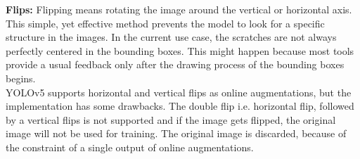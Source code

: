 \textbf{Flips:} Flipping means rotating the image around the vertical or horizontal axis. This simple, yet effective method prevents the model to look for a specific structure in the images. In the current use case, the scratches are not always perfectly centered in the bounding boxes. This might happen because most tools provide a usual feedback only after the drawing process of the bounding boxes begins. \\
YOLOv5 supports horizontal and vertical flips as online augmentations, but the implementation has some drawbacks. The double flip i.e. horizontal flip, followed by a vertical flips is not supported and if the image gets flipped, the original image will not be used for training. The original image is discarded, because of the constraint of a single output of online augmentations. \\

